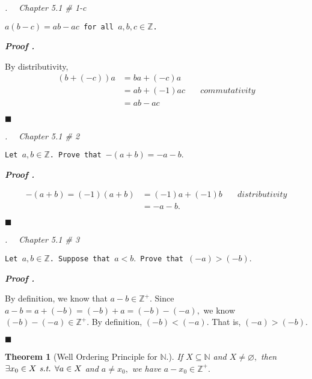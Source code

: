\documentclass[11pt,letter]{article}
\newcounter{nq}[section]
\newcounter{np}[section]
\newtheorem{thm}{Theorem}[section]
\newenvironment*{p}{\par\noindent\textbf{\textit{Proof \stepcounter{np}\thenp. }}\par}{\par\hfill $\blacksquare$\par}
\newenvironment*{q}[1]{\noindent\emph{\thesection.\stepcounter{nq}\thenq$\quad $ #1}\par\noindent\texttt}{}
\def\Z{{\mathbb{Z}}}
\def\N{{\mathbb{N}}}
\def\Zp{{\Z^+}}
\def\emptyset{\varnothing}
\def\st{\emph{ s.t. }}
\begin{document}
\begin{framed}\begin{q}
	{Chapter 5.1 \# 1-c}
	{$a(b-c)=ab-ac$ for all $a,b,c\in\Z$.}
\end{q}\end{framed}
\begin{p}
	By distributivity, \[\begin{aligned}(b+(-c))a&=ba+(-c)a\\&=ab+(-1)ac&\quad commutativity\\&=ab-ac\end{aligned}\]
\end{p}

\begin{framed}\begin{q}
	{Chapter 5.1 \# 2}
	{Let $a,b\in\Z$. Prove that $-(a+b)=-a-b.$}
\end{q}\end{framed}
\begin{p}
	\[\begin{aligned}-(a+b)=(-1)(a+b)&=(-1)a+(-1)b&\quad distributivity\\&=-a-b.\end{aligned}\]	
\end{p}

\begin{framed}\begin{q}
	{Chapter 5.1 \# 3}
	{Let $a,b\in\Z$. Suppose that $a<b.$ Prove that $(-a)>(-b).$}
\end{q}\end{framed}
\begin{p}
	By definition, we know that $a-b\in\Zp.$ Since $a-b=a+(-b)=(-b)+a=(-b)-(-a),$ we know $(-b)-(-a)\in\Zp.$ By definition, $(-b)<(-a).$ That is, $(-a)>(-b).$	
\end{p}

\begin{thm}[Well Ordering Principle for $\N$.]
	If $X\subseteq\N$ and $X\neq\emptyset,$ then $\exists x_0\in X\st\forall a\in X$ and $a\neq x_0,$ we have $a-x_0\in\Zp.$
\end{thm}
\end{document}
